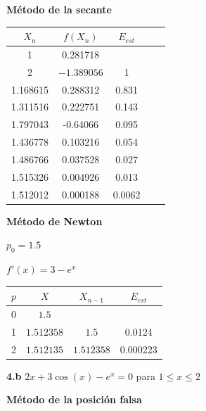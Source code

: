 \documentclass[12pt]{article}
\begin{document}
\textbf{Método de la secante}
\normalsize


\begin{center}
    \begin{tabular}{|c|c|c|c|c|}
        \hline
        $X_n$&$f(X_n)$&$E_{est}$\\
        \hline
        1        &0.281718& \\
        2        &$-1.389056$&1\\
        1.168615 &0.288312&0.831\\
        1.311516 &0.222751&0.143\\
        1.797043 &-0.64066&0.095\\
        1.436778 &0.103216&0.054\\
        1.486766 &0.037528&0.027\\
        1.515326 &0.004926&0.013\\
        1.512012 &0.000188&0.0062\\
        \hline
      \end{tabular} 
\end{center}

\textbf{Método de Newton}
\normalsize

$p_0 = 1.5$

$f'(x) = 3 - e^x$

\begin{center}
    \begin{tabular}{|c|c|c|c|}
        \hline
        $p$&$X$&$X_{n-1}$&$E_{est}$\\
        \hline
        0 & $1.5$&  & \\
        1 &$1.512358$&$1.5$&0.0124\\
        2 &$1.512135$&$1.512358$&0.000223\\
        \hline
      \end{tabular} 
\end{center}




\textbf{4.b} $2x + 3\cos(x)  - e^x = 0$  para $ 1\leq x\leq 2$ 

\textbf{Método de la posición falsa}
\normalsize
\end{document}
